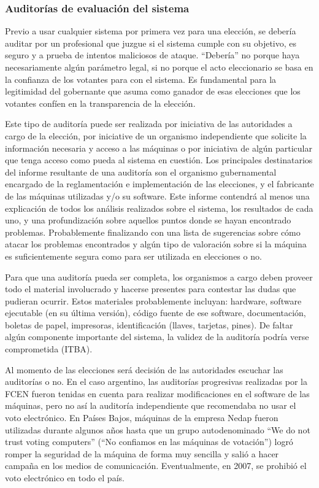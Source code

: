 \subsubsection{Auditorías de evaluación del sistema}

Previo a usar cualquier sistema por primera vez para una elección, se debería auditar por un profesional que juzgue si el sistema cumple con su objetivo, es seguro y a prueba de intentos maliciosos de ataque. “Debería” no porque haya necesariamente algún parámetro legal, si no porque el acto eleccionario se basa en la confianza de los votantes para con el sistema. Es fundamental para la legitimidad del gobernante que asuma como ganador de esas elecciones que los votantes confíen en la transparencia de la elección.

Este tipo de auditoría puede ser realizada por iniciativa de las autoridades a cargo de la elección\cite{righetti}, por iniciative de un organismo independiente que solicite la información necesaria y acceso a las máquinas\cite{holanda}\cite{itba} o por iniciativa de algún particular que tenga acceso como pueda al sistema en cuestión\cite{votar}.
Los principales destinatarios del informe resultante de una auditoría son el organismo gubernamental encargado de la reglamentación e implementación de las elecciones, y el fabricante de las máquinas utilizadas y/o su software. Este informe contendrá al menos una explicación de todos los análisis realizados sobre el sistema, los resultados de cada uno, y una profundización sobre aquellos puntos donde se hayan encontrado problemas. Probablemente finalizando con una lista de sugerencias sobre cómo atacar los problemas encontrados y algún tipo de valoración sobre si la máquina es suficientemente segura como para ser utilizada en elecciones o no.

Para que una auditoría pueda ser completa, los organismos a cargo deben proveer todo el material involucrado y hacerse presentes para contestar las dudas que pudieran ocurrir. Estos materiales probablemente incluyan: hardware, software ejecutable (en su última versión), código fuente de ese software, documentación, boletas de papel, impresoras, identificación (llaves, tarjetas, pines). De faltar algún componente importante del sistema, la validez de la auditoría podría verse comprometida (ITBA).

Al momento de las elecciones será decisión de las autoridades escuchar las auditorías o no. En el caso argentino, las auditorías progresivas realizadas por la FCEN fueron tenidas en cuenta para realizar modificaciones en el software de las máquinas, pero no así la auditoría independiente que recomendaba no usar el voto electrónico. En Países Bajos, máquinas de la empresa Nedap fueron utilizadas durante algunos años hasta que un grupo autodenominado “We do not trust voting computers” (“No confiamos en las máquinas de votación”) logró romper la seguridad de la máquina de forma muy sencilla y salió a hacer campaña en los medios de comunicación. Eventualmente, en 2007, se prohibió el voto electrónico en todo el país\cite{holanda}.

